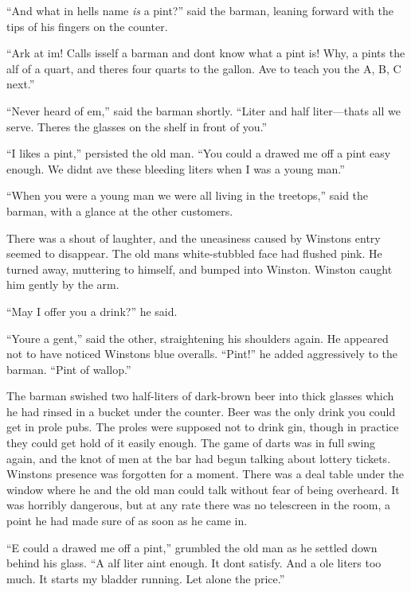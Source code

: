 ``And what in hell\textquotesingle s name \emph{is} a pint?'' said the
barman, leaning forward with the tips of his fingers on the counter.

``\textquotesingle Ark at \textquotesingle im! Calls
\textquotesingle isself a barman and don\textquotesingle t know what a
pint is! Why, a pint\textquotesingle s the \textquotesingle alf of a
quart, and there\textquotesingle s four quarts to the gallon.
\textquotesingle Ave to teach you the A, B, C next.''

``Never heard of \textquotesingle em,'' said the barman shortly. ``Liter
and half liter---that\textquotesingle s all we serve.
There\textquotesingle s the glasses on the shelf in front of you.''

``I likes a pint,'' persisted the old man. ``You could \textquotesingle a
drawed me off a pint easy enough. We didn\textquotesingle t
\textquotesingle ave these bleeding liters when I was a young man.''

``When you were a young man we were all living in the treetops,'' said the
barman, with a glance at the other customers.

There was a shout of laughter, and the uneasiness caused by
Winston\textquotesingle s entry seemed to disappear. The old
man\textquotesingle s white-stubbled face had flushed pink. He turned
away, muttering to himself, and bumped into Winston. Winston caught him
gently by the arm.

``May I offer you a drink?'' he said.

``You\textquotesingle re a gent,'' said the other, straightening his
shoulders again. He appeared not to have noticed
Winston\textquotesingle s blue overalls. ``Pint!'' he added aggressively
to the barman. ``Pint of wallop.''

The barman swished two half-liters of dark-brown beer into thick glasses
which he had rinsed in a bucket under the counter. Beer was the only
drink you could get in prole pubs. The proles were supposed not to drink
gin, though in practice they could get hold of it easily enough. The
game of darts was in full swing again, and the knot of men at the bar
had begun talking about lottery tickets. Winston\textquotesingle s
presence was forgotten for a moment. There was a deal table under the
window where he and the old man could talk without fear of being
overheard. It was horribly dangerous, but at any rate there was no
telescreen in the room, a point he had made sure of as soon as he came
in.

``\textquotesingle E could \textquotesingle a drawed me off a pint,''
grumbled the old man as he settled down behind his glass. ``A
\textquotesingle alf liter ain\textquotesingle t enough. It
don\textquotesingle t satisfy. And a \textquotesingle ole
liter\textquotesingle s too much. It starts my bladder running. Let
alone the price.''

